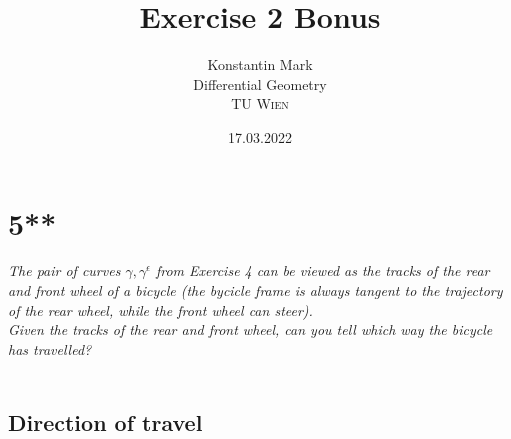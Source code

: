 \documentclass[11pt]{article}
\title{Exercise 2 Bonus}
\author{Konstantin Mark\\
Differential Geometry\\ 
\textsc{TU Wien}
}
\date{17.03.2022}
\begin{document}
\maketitle


\section*{5**}
{\itshape
The pair of curves $\gamma,\gamma^\epsilon$ from Exercise 4 can be viewed as the tracks of the rear and front wheel of a bicycle (the bycicle frame is always tangent to the trajectory of the rear wheel, while the front wheel can steer).\\
Given the tracks of the rear and front wheel, can you tell which way the bicycle has travelled?
}\\~\\

\subsection{Direction of travel}
\end{document}
